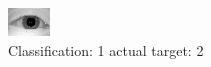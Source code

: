 \begin{figure}[h!]
\begin{center}
\includegraphics[width=0.60\columnwidth]{figures/ID888_class_1_target_2.png}
\end{center}
\caption{ Classification: 1 actual target: 2}
\label{fig:ID888_class_1_target_2}
\end{figure}
